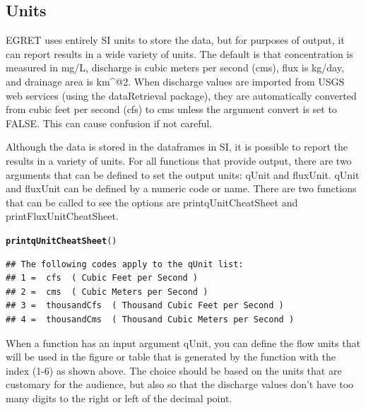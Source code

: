 \documentclass[a4paper,11pt]{article}\usepackage{graphicx, color}
\makeatletter
\newcommand{\hlfunctioncall}[1]{\textcolor[rgb]{0.501960784313725,0,0.329411764705882}{\textbf{#1}}}%
\newenvironment{kframe}{%
 \def\at@end@of@kframe{}%
 \ifinner\ifhmode%
  \def\at@end@of@kframe{\end{minipage}}%
  \begin{minipage}{\columnwidth}%
 \fi\fi%
 \def\FrameCommand##1{\hskip\@totalleftmargin \hskip-\fboxsep
 \colorbox{shadecolor}{##1}\hskip-\fboxsep
     \hskip-\linewidth \hskip-\@totalleftmargin \hskip\columnwidth}%
 \MakeFramed {\advance\hsize-\width
   \@totalleftmargin\z@ \linewidth\hsize
   \@setminipage}}%
 {\par\unskip\endMakeFramed%
 \at@end@of@kframe}
\newenvironment{knitrout}{}{} %
\makeatother
\begin{document}
\FloatBarrier
\pagebreak


\subsection{Units}
\label{sec:units}
EGRET uses entirely SI units to store the data, but for purposes of output, it can report results in a wide variety of units. The default is that concentration is measured in mg/L, discharge is cubic meters per second (cms), flux is kg/day, and drainage area is km\verb@^@2. When discharge values are imported from USGS web services (using the dataRetrieval package), they are automatically converted from cubic feet per second (cfs) to cms unless the argument convert is set to FALSE.  This can cause confusion if not careful. 

Although the data is stored in the dataframes in SI, it is possible to report the results in a variety of units. For all functions that provide output, there are two arguments that can be defined to set the output units: qUnit and fluxUnit.  qUnit and fluxUnit can be defined by a numeric code or name.  There are two functions that can be called to see the options are printqUnitCheatSheet and printFluxUnitCheatSheet.


\begin{knitrout}
\color{fgcolor}\begin{kframe}
\begin{alltt}
\hlfunctioncall{printqUnitCheatSheet}()
\end{alltt}
\begin{verbatim}
## The following codes apply to the qUnit list:
## 1 =  cfs  ( Cubic Feet per Second )
## 2 =  cms  ( Cubic Meters per Second )
## 3 =  thousandCfs  ( Thousand Cubic Feet per Second )
## 4 =  thousandCms  ( Thousand Cubic Meters per Second )
\end{verbatim}
\end{kframe}
\end{knitrout}


When a function has an input argument qUnit, you can define the flow units that will be used in the figure or table that is generated by the function with the index (1-6) as shown above. The choice should be based on the units that are customary for the audience, but also so that the discharge values don't have too many digits to the right or left of the decimal point.
\end{document}
